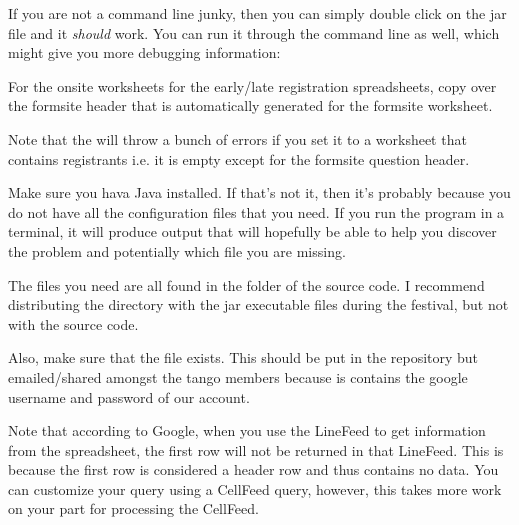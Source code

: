 \documentclass[12pt,final]{article}
\begin{document}
If you are not a command line junky, then you can simply double click on the jar file and it \emph{should} work. You can
run it through the command line as well, which might give you more debugging information:
\bitem
\eitem


For the onsite worksheets for the early/late registration spreadsheets, copy
over the formsite header that is automatically generated for the formsite
worksheet.

Note that the  will throw a bunch of errors if you set
it to a worksheet that contains  registrants i.e. it is empty except for
the formsite question header.


Make sure you hava Java installed. If that's not it, then it's probably
because you do not have all the configuration files that you need. If you run
the program in a terminal, it will produce output that will hopefully be able
to help you discover the problem and potentially which file you are missing.

The files you need are all found in the  folder of the source code.
I recommend distributing the  directory with the jar executable
files during the festival, but not with the source code. 

Also, make sure that the  file exists. This should
 be put in the repository but emailed/shared amongst the tango
members because is contains the google username and password of our account.


Note that according to Google, when you use the LineFeed to get information
from the spreadsheet, the first row will not be returned in that LineFeed.
This is because the first row is considered a header row and thus
contains no data. You can customize your query using a CellFeed query,
however, this takes more work on your part for processing the CellFeed.
\end{document}
